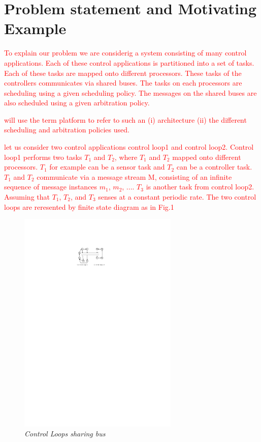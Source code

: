 \section{Problem statement and Motivating Example} \label{sec3}
\noindent

\textcolor{red}{To explain our problem we are considerig a system consisting of many control
applications. Each of these control applications is partitioned into a set of
tasks. Each of these tasks are mapped onto different processors. These tasks 
of the controllers communicates via shared buses. The tasks on each processors
are scheduling using a given scheduling policy. The messages on the shared buses
are also scheduled using a given arbitration policy.}

\textcolor{red}{ will use the term platform to refer to such an (i) architecture (ii) the 
different scheduling and arbitration policies used. }

\textcolor{red}{ let us consider two control applications control loop1 and control loop2.
Control loop1 performs two tasks $T_1$ and $T_2$, where $T_1$ and $T_2$ mapped onto 
different processors. $T_1$ for example can be a sensor task and $T_2$ can be a controller 
task. $T_1$ and $T_2$ communicate via a message stream M, consisting of an infinite sequence 
of message instances $m_1$, $m_2$, .... $T_3$ is another task from control loop2. Assuming 
that $T_1$, $T_2$, and $T_3$ senses at a constant periodic rate. The two control loops are 
reresented by finite state diagram as in Fig.1 }
 

\begin{figure}[h]
\begin{center}
\includegraphics[width=3.0in]{diagram.pdf}
\end{center}
\vspace{-0.1in}
\caption{{\em Control Loops sharing bus}}
\label{fig:automaton}
\end{figure}

